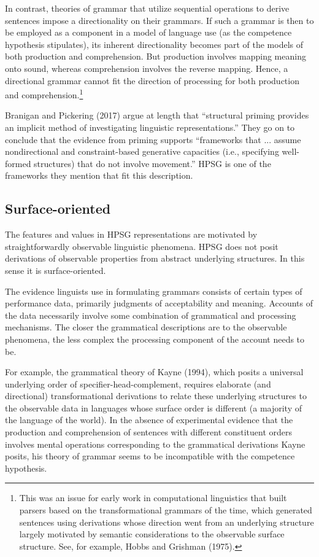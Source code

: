 \documentclass[a4paper]{article}
\begin{document}
In contrast, theories of grammar that utilize sequential operations to derive sentences impose a directionality on their grammars.  If such a grammar is then to be employed as a component in a model of language use (as the competence hypothesis stipulates), its inherent directionality becomes part of the models of both production and comprehension.  But production involves mapping meaning onto sound, whereas comprehension involves the reverse mapping.  Hence, a directional grammar cannot fit the direction of processing for both production and comprehension.\footnote{This was an issue for early work in computational linguistics that built parsers based on the transformational grammars of the time, which generated sentences using derivations whose direction went from an underlying structure largely motivated by semantic considerations to the observable surface structure.  See, for example, Hobbs and Grishman (1975).}  

Branigan and Pickering (2017) argue at length that ``structural priming provides an implicit method of investigating linguistic representations.''  They go on to conclude that the evidence from priming supports ``frameworks that ... assume nondirectional and constraint-based generative
capacities (i.e., specifying well-formed structures) that
do not involve movement.''  HPSG is one of the frameworks they mention that fit this description.

\subsection{Surface-oriented}

The features and values in HPSG representations are motivated
by straightforwardly observable linguistic phenomena. HPSG does not posit derivations of observable properties from abstract underlying structures.  In this sense it is surface-oriented.

The evidence linguists use in formulating grammars consists of certain types of performance data, primarily judgments of acceptability and meaning.  Accounts of the data necessarily involve some combination of grammatical and processing mechanisms.  The closer the grammatical descriptions are to the observable phenomena, the less complex the processing component of the account needs to be.

For example, the grammatical theory of Kayne (1994), which posits a universal underlying order of specifier-head-complement, requires elaborate (and directional) transformational derivations to relate these underlying structures to the observable data in languages whose surface order is different (a majority of the language of the world).  In the absence of experimental evidence that the production and comprehension of sentences with different constituent orders involves mental operations corresponding to the grammatical derivations Kayne posits, his theory of grammar seems to be incompatible with the competence hypothesis.
\end{document}
